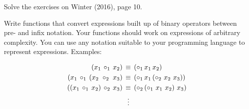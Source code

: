 \documentclass[10pt,a4paper]{exam}
\begin{document}


\vspace{10pt}

% 

\vspace{90pt}

\begin{questions}
\question Solve the exercises on Winter (2016), page 10. 

\question Write functions that convert expressions built up of binary operators between pre- and infix notation. Your functions should work on expressions of arbitrary complexity. You can use any notation suitable to your programming language to represent expressions. Examples:

\begin{align*}
(x_1\, \circ_1\, x_2)\, & \equiv\, (\circ_1\, x_1\, x_2)\\
(x_1\, \circ_1\, (x_2\,\, \circ_2\,\, x_3)\, & \equiv\, (\circ_1\, x_1\, (\circ_2\,\, x_2\,\, x_3))\\
((x_1\, \circ_1\, x_2)\, \circ_2\, x_3)\, & \equiv\, (\circ_2\, (\circ_1\,\, x_1\,\, x_2)\ x_3)\\
 &\hspace{5.6pt} \vdots
\end{align*}

\end{questions}
\end{document}
